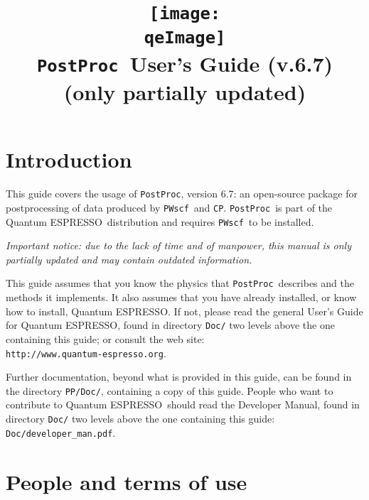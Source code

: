 \documentclass[12pt,a4paper]{article}
\def\version{6.7}
\def\qe{{\sc Quantum ESPRESSO}}
\def\PWscf{\texttt{PWscf}}
\def\CP{\texttt{CP}}
\def\PostProc{\texttt{PostProc}}
\begin{document}
 
\author{}
\date{}

\def\qeImage{../../Doc/quantum_espresso}

\title{
  \texttt{[image: \\qeImage]} \\
  \Huge \PostProc\ User's Guide (v.\version) 
  \\ \Large (only partially updated)
}

\maketitle

\tableofcontents

\section{Introduction}

This guide covers the usage of \PostProc, version \version: 
an open-source package for postprocessing of data produced by
\PWscf\ and \CP. \PostProc\ is part of the \qe\ distribution 
and requires \PWscf\ to be installed.

{\em Important notice: due to the lack of time and of manpower, this
manual is only partially updated and may contain outdated information.}

This guide assumes that you know the physics 
that \PostProc\ describes and the methods it implements.
It also assumes  that you have already installed,
or know how to install, \qe. If not, please read
the general User's Guide for \qe, found in 
directory \texttt{Doc/} two levels above the 
one containing this guide; or consult the web site:\\
\texttt{http://www.quantum-espresso.org}.

Further documentation, beyond what is provided 
in this guide, can be found in the directory
\texttt{PP/Doc/}, containing a copy of this guide.
People who want to contribute to \qe\ should read the 
Developer Manual, found in directory \texttt{Doc/} two levels
above the one containing this guide: \texttt{Doc/developer\_man.pdf}.

\section{People and terms of use}
\end{document}
